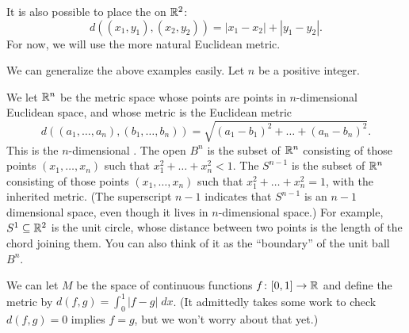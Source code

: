 \begin{example}[Taxicab on $\RR^2$]
	It is also possible to place the  on $\RR^2$:
	\[ d\left( (x_1, y_1), (x_2, y_2) \right) =
		\left\lvert x_1-x_2 \right\rvert + \left\lvert y_1-y_2 \right\rvert.
		\]
	For now, we will use the more natural Euclidean metric.
\end{example}

\begin{example}
	We can generalize the above examples easily.
	Let $n$ be a positive integer.
	\begin{enumerate}[(a)]
		\ii We let $\mathbb R^n$ be the metric space whose points are points in $n$-dimensional Euclidean space,
		and whose metric is the Euclidean metric
		\[
			d\left(
			\left( a_1, \dots, a_n \right), \left( b_1, \dots, b_n \right)
			\right)
			= \sqrt{(a_1-b_1)^2 + \dots + (a_n-b_n)^2}.
		\]
		This is the $n$-dimensional .
		\ii The open  $B^{n}$ is the subset of $\mathbb R^n$
		consisting of those points $\left( x_1, \dots, x_n \right)$
		such that $x_1^2 + \dots + x_n^2 < 1$.
		\ii The  $S^{n-1}$ is the subset of $\mathbb R^n$
		consisting of those points $\left( x_1, \dots, x_n \right)$
		such that $x_1^2 + \dots + x_n^2 = 1$, with the inherited metric.
		(The superscript $n-1$ indicates that $S^{n-1}$ is an $n-1$ dimensional space,
		even though it lives in $n$-dimensional space.)
		For example, $S^1 \subseteq \mathbb R^2$ is the unit circle,
		whose distance between two points is the length of the chord joining them.
		You can also think of it as the ``boundary'' of the unit ball $B^n$.
	\end{enumerate}
\end{example}
\begin{example}
	We can let $M$ be the space of
	continuous functions $f \colon [0,1] \to \mathbb R$ and define the metric
	by $d(f,g) = \int_0^1 \left\lvert f-g \right\rvert \; dx$.
	(It admittedly takes some work to check $d(f,g) = 0$ implies $f=g$,
	but we won't worry about that yet.)
\end{example}

